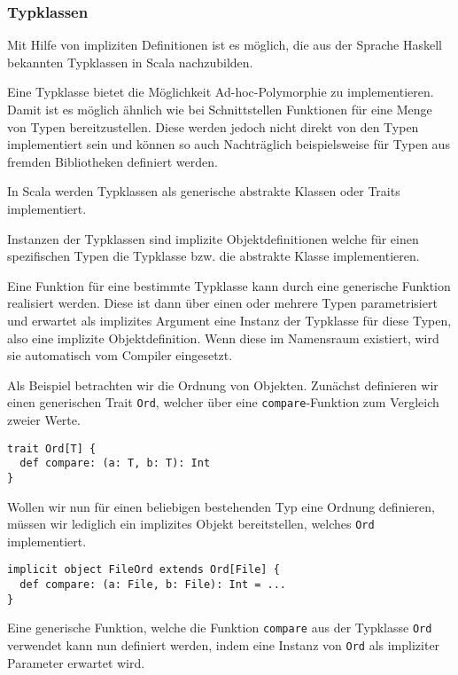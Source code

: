 \subsubsection{Typklassen}

Mit Hilfe von impliziten Definitionen ist es möglich, die aus der Sprache Haskell  bekannten
Typklassen in Scala nachzubilden.

Eine Typklasse bietet die Möglichkeit Ad-hoc-Polymorphie zu implementieren. Damit ist es möglich
ähnlich wie bei Schnittstellen Funktionen für eine Menge von Typen bereitzustellen. Diese werden
jedoch nicht direkt von den Typen implementiert sein und können so auch Nachträglich beispielsweise
für Typen aus fremden Bibliotheken definiert werden.

In Scala werden Typklassen als generische abstrakte Klassen oder Traits implementiert.

Instanzen der Typklassen sind implizite Objektdefinitionen welche für einen spezifischen Typen die
Typklasse bzw. die abstrakte Klasse implementieren.

Eine Funktion für eine bestimmte Typklasse kann durch eine generische Funktion  realisiert werden.
Diese ist dann über einen oder mehrere Typen parametrisiert  und erwartet als implizites Argument
eine Instanz der Typklasse für diese Typen,  also eine implizite Objektdefinition. Wenn diese im
Namensraum existiert, wird  sie automatisch vom Compiler eingesetzt.

Als Beispiel betrachten wir die Ordnung von Objekten. Zunächst definieren wir einen generischen
Trait \texttt{Ord}, welcher über eine \texttt{compare}-Funktion zum Vergleich zweier Werte.

\begin{lstlisting}
trait Ord[T] {
  def compare: (a: T, b: T): Int
}
\end{lstlisting}

Wollen wir nun für einen beliebigen bestehenden Typ eine Ordnung definieren, müssen wir lediglich
ein implizites Objekt bereitstellen, welches \texttt{Ord} implementiert.

\begin{lstlisting}
implicit object FileOrd extends Ord[File] {
  def compare: (a: File, b: File): Int = ...
}
\end{lstlisting}

Eine generische Funktion, welche die Funktion \texttt{compare} aus der Typklasse \texttt{Ord}
verwendet kann nun definiert werden, indem eine Instanz von \texttt{Ord} als impliziter Parameter
erwartet wird.

